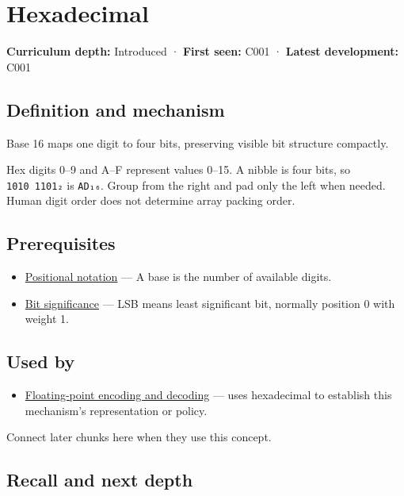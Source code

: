 \hypertarget{appendix-6b8075763724}{}
\section{Hexadecimal}\label{appendix-6b8075763724-hexadecimal}

\textbf{Curriculum depth:} Introduced · \textbf{First seen:} C001 · \textbf{Latest development:} C001

\subsection{Definition and mechanism}\label{appendix-6b8075763724-definition-and-mechanism}

Base 16 maps one digit to four bits, preserving visible bit structure compactly.

Hex digits 0--9 and A--F represent values 0--15. A nibble is four bits, so \texttt{1010\ 1101₂} is \texttt{AD₁₆}. Group from the right and pad only the left when needed. Human digit order does not determine array packing order.

\subsection{Prerequisites}\label{appendix-6b8075763724-prerequisites}

\begin{itemize}
\tightlist
\item
  \hyperref[appendix-83c3f28f7bda]{Positional notation} --- A base is the number of available digits.
\item
  \hyperref[appendix-280445746493]{Bit significance} --- LSB means least significant bit, normally position 0 with weight 1.
\end{itemize}

\subsection{Used by}\label{appendix-6b8075763724-used-by}

\begin{itemize}
\tightlist
\item
  \hyperref[appendix-6854d0e2218e]{Floating-point encoding and decoding} --- uses hexadecimal to establish this mechanism's representation or policy.
\end{itemize}

Connect later chunks here when they use this concept.

\subsection{Recall and next depth}\label{appendix-6b8075763724-recall-and-next-depth}

